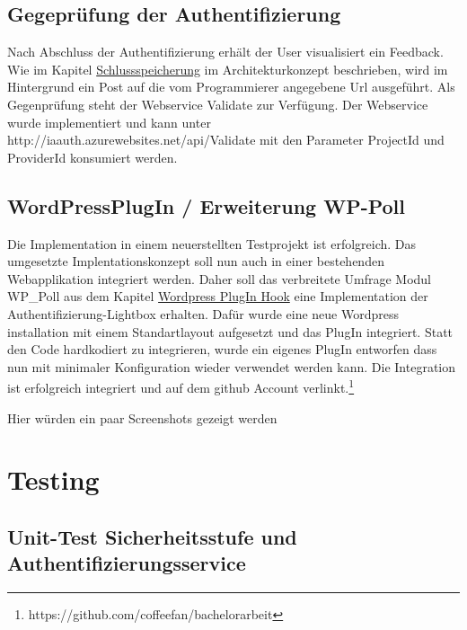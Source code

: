 \newpage

\subsection{Gegeprüfung der
Authentifizierung}\label{gegepruxfcfung-der-authentifizierung}

Nach Abschluss der Authentifizierung erhält der User visualisiert ein
Feedback. Wie im Kapitel
\protect\hyperlink{schlussspeicherung}{Schlussspeicherung} im
Architekturkonzept beschrieben, wird im Hintergrund ein Post auf die vom
Programmierer angegebene Url ausgeführt. Als Gegenprüfung steht der
Webservice Validate zur Verfügung. Der Webservice wurde implementiert
und kann unter http://iaauth.azurewebsites.net/api/Validate mit den
Parameter ProjectId und ProviderId konsumiert werden.

\subsection{WordPressPlugIn / Erweiterung
WP-Poll}\label{wordpressplugin-erweiterung-wp-poll}

Die Implementation in einem neuerstellten Testprojekt ist erfolgreich.
Das umgesetzte Implentationskonzept soll nun auch in einer bestehenden
Webapplikation integriert werden. Daher soll das verbreitete Umfrage
Modul WP\_Poll aus dem Kapitel
\protect\hyperlink{wordpress-plugin-hook}{Wordpress PlugIn Hook} eine
Implementation der Authentifizierung-Lightbox erhalten. Dafür wurde eine
neue Wordpress installation mit einem Standartlayout aufgesetzt und das
PlugIn integriert. Statt den Code hardkodiert zu integrieren, wurde ein
eigenes PlugIn entworfen dass nun mit minimaler Konfiguration wieder
verwendet werden kann. Die Integration ist erfolgreich integriert und
auf dem github Account verlinkt.\footnote{https://github.com/coffeefan/bachelorarbeit}

Hier würden ein paar Screenshots gezeigt werden

\newpage

\hypertarget{testing-1}{\section{Testing}\label{testing-1}}

\subsection{Unit-Test Sicherheitsstufe und
Authentifizierungsservice}\label{unit-test-sicherheitsstufe-und-authentifizierungsservice}

